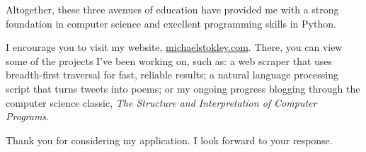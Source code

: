 \documentclass[10pt,a4paper,sans]{moderncv}        %
\begin{document}
Altogether, these three avenues of education have provided me with a strong
foundation in computer science and excellent programming skills in Python.

I encourage you to visit my website,
{\href{http://michaelstokley.com}{michaelstokley.com}}. There, you can view some
of the projects I've been working on, such as: a web scraper that uses
breadth-first traversal for fast, reliable results; a natural language
processing script that turns tweets into poems; or my ongoing progress blogging
through the computer science classic, \textit{The Structure and Interpretation
  of Computer Programs}.

Thank you for considering my application. I look forward to your response.

\makeletterclosing
\end{document}
